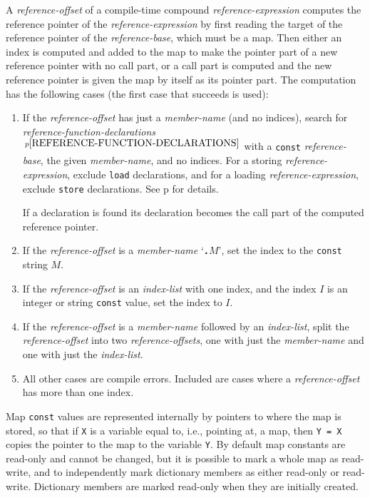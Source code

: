 \documentclass[12pt]{article}
\newcommand{\TT}[1]{{\tt \bfseries #1}}
\newcommand{\pagref}[1]{p\pageref{#1}}
\newcommand{\pagnote}[1]{$\,^{p\pageref{#1}}$}
\begin{document}
A {\em reference-offset} of a compile-time compound {\em reference-expression}
computes the reference pointer of the {\em reference-expression}
by first reading the target of the reference pointer of the
{\em reference-base}, which must be a map.  Then either an index is
computed and added to the map to make the pointer part
of a new reference pointer with no call part, or a call part is computed
and the new reference pointer is given the map by itself as its pointer part.
The computation has the following cases (the first case that
succeeds is used):\label{COMPILE-TIME-FIELD-SELECTION}
\begin{enumerate}
\item If the {\em reference-offset} has just a {\em member-name}
(and no indices), search for {\em reference-function-declarations}%
\pagnote{REFERENCE-FUNCTION-DECLARATIONS} with a {\tt const}
{\em reference-base}, the given {\em member-name}, and no indices.
For a storing
{\em reference-expression}, exclude {\tt load} declarations, and
for a loading {\em reference-expression}, exclude {\tt store}
declarations.  See
\pagref{REFERENCE-CALL-REFERENCE-DECLARATION-OFFSET-MATCHING} for details.

If a declaration is found its declaration becomes the call part of the
computed reference pointer.

\item If the {\em reference-offset} is a {\em member-name} `\TT{.}$M$',
set the index to the {\tt const} string $M$.
\item If the {\em reference-offset} is an {\em index-list} with one
index, and the index $I$ is an integer or string {\tt const} value,
set the index to $I$.
\item If the {\em reference-offset} is a {\em member-name} followed
by an {\em index-list}, split the {\em reference-offset} into two
{\em reference-offsets}, one with just the {\em member-name} and one with
just the {\em index-list}.
\item All other cases are compile errors.
Included are cases where a {\em reference-offset} has more than one index.
\end{enumerate}

Map {\tt const} values are represented internally by pointers to where
the map is stored, so that if {\tt X} is a variable equal to,
i.e., pointing at, a map, then {\tt Y = X} copies the pointer
to the map to the variable {\tt Y}.  By default map constants
are read-only and cannot be changed, but it is possible to mark
a whole map as read-write, and to independently mark dictionary members
as either read-only or read-write.
Dictionary members are marked read-only when they are initially created.
\end{document}
